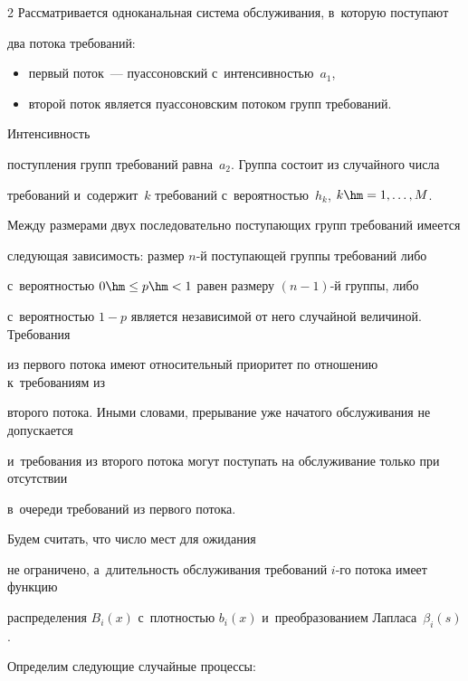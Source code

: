 \begin{multicols}{2}
Рассматривается одноканальная система обслуживания, в~которую поступают 


два потока требований: 


\begin{itemize}


\item первый поток~--- пуассоновский с~интенсив\-ностью~$a_1$, 


\item второй поток является пуассоновским потоком групп требований.


\end{itemize}


Интенсивность 


поступления групп требований равна~$a_2$. Группа состоит из случайного числа 


требований и~содержит~$k$ требований с~вероятностью~$h_k$, $k\hm=1,\ldots,M$. 


Между размерами двух последо\-ва\-тельно по\-сту\-па\-ющих групп требований имеется 


следующая зависимость: размер $n$-й по\-сту\-па\-ющей группы требований либо 


с~ве\-ро\-ят\-ностью $0\hm\leq p\hm<1$ равен размеру $(n-1)$-й группы, либо 


с~ве\-ро\-ят\-ностью $1-p$ является независимой от него случайной величиной. Требования 


из первого потока имеют относительный приоритет по отношению к~требованиям из 


второго потока. Иными словами, прерывание уже начатого обслуживания не допускается 


и~требования из второго потока могут поступать на обслуживание только при отсутствии 


в~очереди требований из первого по\-тока. 


%


Будем считать, что число мест для ожидания 


не ограничено, а~длительность обслуживания требований $i$-го потока имеет функцию 


распределения $B_i(x)$ с~плотностью $b_i(x)$ и~преобразованием Лапласа~$\beta_i(s)$.





\pagebreak





Определим следующие случайные процессы:



\end{multicols}
